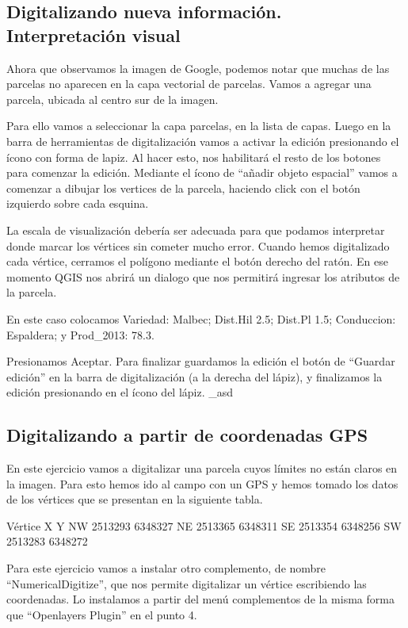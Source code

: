 \documentclass[]{article}
\begin{document}
\subsection{Digitalizando nueva información. Interpretación visual}

Ahora que observamos la imagen de Google, podemos notar que muchas de las parcelas no aparecen en la capa vectorial de parcelas. Vamos a agregar una parcela, ubicada al centro sur de la imagen. 

Para ello vamos a seleccionar la capa parcelas, en la lista de capas. Luego en la barra de herramientas de digitalización vamos a activar la edición presionando el ícono con forma de lapiz. Al hacer esto, nos habilitará el resto de los botones para comenzar la edición. Mediante el ícono de “añadir objeto espacial” vamos a comenzar a dibujar los vertices de la parcela, haciendo click con el botón izquierdo sobre cada esquina. 

La escala de visualización debería ser adecuada para que podamos interpretar donde marcar los vértices sin cometer mucho error. Cuando hemos digitalizado cada vértice, cerramos el polígono mediante el botón derecho del ratón.
En ese momento QGIS nos abrirá un dialogo que nos permitirá ingresar los atributos de la parcela.


En este caso colocamos Variedad: Malbec; Dist.Hil 2.5; Dist.Pl 1.5; Conduccion: Espaldera; y Prod\_2013: 78.3.

Presionamos Aceptar. Para finalizar guardamos la edición el botón de “Guardar edición” en la barra de digitalización (a la derecha del lápiz), y finalizamos la edición presionando en el ícono del lápiz.
\_asd

\subsection{Digitalizando a partir de coordenadas GPS}

En este ejercicio vamos a digitalizar una parcela cuyos límites no están claros en la imagen. Para esto hemos ido al campo con un GPS y hemos tomado los datos de los vértices que se presentan en la siguiente tabla.

Vértice
X
Y
NW
2513293
6348327
NE
2513365
6348311
SE
2513354
6348256
SW
2513283
6348272

Para este ejercicio vamos a instalar otro complemento, de nombre “NumericalDigitize”, que nos permite digitalizar un vértice escribiendo las coordenadas. Lo instalamos a partir del menú complementos de la misma forma que “Openlayers Plugin” en el punto 4.
\end{document}
